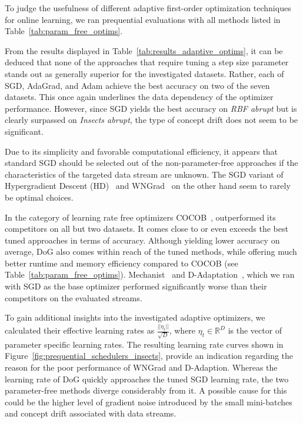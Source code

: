 \documentclass[runningheads]{llncs}
\begin{document}
To judge the usefulness of different adaptive first-order optimization techniques for online learning, we ran prequential evaluations with all methods listed in Table~\ref{tab:param_free_optims}.

From the results displayed in Table~\ref{tab:results_adaptive_optims}, it can be deduced that none of the approaches that require tuning a step size parameter stands out as generally superior for the investigated datasets.
Rather, each of SGD, AdaGrad, and Adam achieve the best accuracy on two of the seven datasets.
This once again underlines the data dependency of the optimizer performance.
However, since SGD yields the best accuracy on \textit{RBF abrupt} but is clearly surpassed on \textit{Insects abrupt}, the type of concept drift does not seem to be significant.

Due to its simplicity and favorable computational efficiency, it appears that standard SGD should be selected out of the non-parameter-free approaches if the characteristics of the targeted data stream are unknown.
The SGD variant of Hypergradient Descent (HD)~\cite{baydinOnlineLearningRate2018} and WNGrad~\cite{wuWNGradLearnLearning2020} on the other hand seem to rarely be optimal choices.

In the category of learning rate free optimizers COCOB~\cite{orabonaTrainingDeepNetworks2017}, outperformed its competitors on all but two datasets.
It comes close to or even exceeds the best tuned approaches in terms of accuracy.
Although yielding lower accuracy on average, DoG also comes within reach of the tuned methods, while offering much better runtime and memory efficiency compared to COCOB (see Table~\ref{tab:param_free_optims}).
Mechanist~\cite{cutkoskyMechanicLearningRate2023} and D-Adaptation~\cite{defazioLearningRateFreeLearningDAdaptation2023a}, which we ran with SGD as the base optimizer performed significantly worse than their competitors on the evaluated streams.

To gain additional insights into the investigated adaptive optimizers, we calculated their effective learning rates as $\frac{||\eta_t||}{\sqrt{D}}$, where $\eta_t \in \mathbb{R}^D$ is the vector of parameter specific learning rates.
The resulting learning rate curves shown in Figure~\ref{fig:prequential_schedulers_insects}, provide an indication regarding the reason for the poor performance of WNGrad and D-Adaption.
Whereas the learning rate of DoG quickly approaches the tuned SGD learning rate, the two parameter-free methods diverge considerably from it.
A possible cause for this could be the higher level of gradient noise introduced by the small mini-batches and concept drift associated with data streams.
\end{document}
